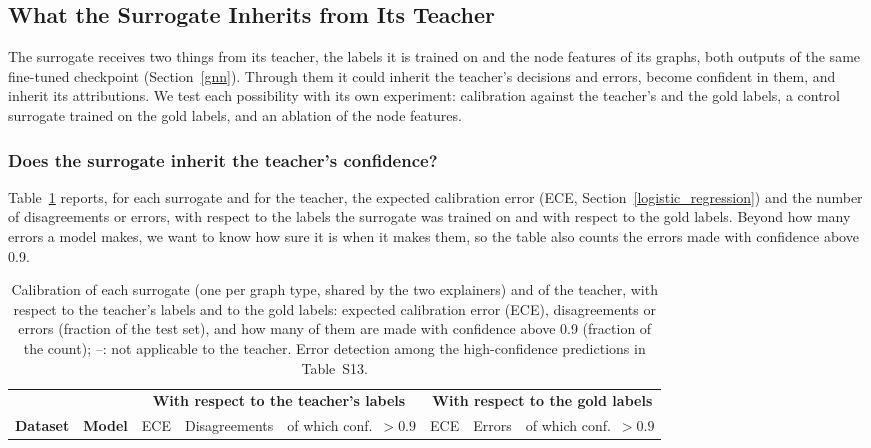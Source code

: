 \documentclass[preprint, times, review, 10pt]{elsarticle}
\begin{document}
\subsection{What the Surrogate Inherits from Its Teacher} \label{sec:calibration} \label{sec:ablation}

The surrogate receives two things from its teacher, the labels it is trained on and the node features of its graphs, both outputs of the same fine-tuned checkpoint (Section~\ref{gnn}). Through them it could inherit the teacher's decisions and errors, become confident in them, and inherit its attributions. We test each possibility with its own experiment: calibration against the teacher's and the gold labels, a control surrogate trained on the gold labels, and an ablation of the node features.

\subsubsection{Does the surrogate inherit the teacher's confidence?} \label{sec:inherit_conf}
Table~\ref{tab:calibration} reports, for each surrogate and for the teacher, the expected calibration error (ECE, Section~\ref{logistic_regression}) and the number of disagreements or errors, with respect to the labels the surrogate was trained on and with respect to the gold labels. Beyond how many errors a model makes, we want to know how sure it is when it makes them, so the table also counts the errors made with confidence above 0.9.

\begin{table}[H]
\centering
\scriptsize
\setlength{\tabcolsep}{4pt}
\caption{Calibration of each surrogate (one per graph type, shared by the two explainers) and of the teacher, with respect to the teacher's labels and to the gold labels: expected calibration error (ECE), disagreements or errors (fraction of the test set), and how many of them are made with confidence above 0.9 (fraction of the count); --: not applicable to the teacher. Error detection among the high-confidence predictions in Table~S13.}
\label{tab:calibration}
\begin{tabular}{@{}llcccccc@{}}
\toprule
& & \multicolumn{3}{c}{\textbf{With respect to the teacher's labels}} & \multicolumn{3}{c}{\textbf{With respect to the gold labels}} \\
\cmidrule(lr){3-5} \cmidrule(lr){6-8}
\textbf{Dataset} & \textbf{Model} & ECE & Disagreements & of which conf.\ \(>0.9\) & ECE & Errors & of which conf.\ \(>0.9\) \\
\midrule

\end{tabular}
\end{table}
\end{document}
